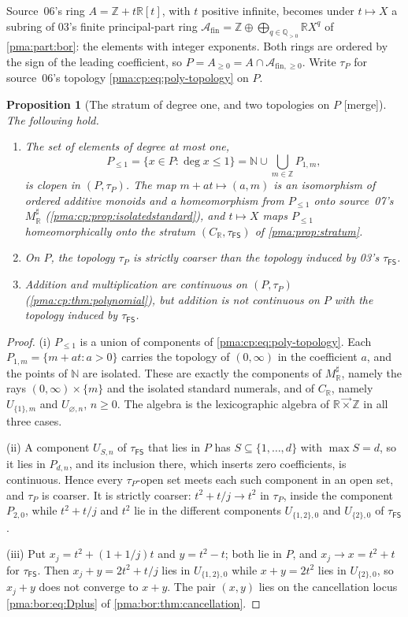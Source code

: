 \documentclass[11pt]{article}
\numberwithin{equation}{section}
\newtheorem{proposition}[proposition]{Proposition}
\theoremstyle{definition}
\theoremstyle{remark}
\newcommand{\N}{\mathbb N}
\newcommand{\Z}{\mathbb Z}
\newcommand{\Q}{\mathbb Q}
\newcommand{\R}{\mathbb R}
\newcommand{\lex}{\mathbin{\overrightarrow\times}}
\newcommand{\FS}{\mathsf{FS}}
\newcommand{\A}{\mathcal A_{\mathrm{fin}}}
\newcommand{\PP}{\mathcal A_{\mathrm{fin},\geq 0}}
\newcommand{\mergetag}{\textup{\textsf{\small[merge]}}}
\begin{document}
Source~06's ring $A=\Z+t\R[t]$, with $t$ positive infinite, becomes under
$t\mapsto X$ a subring of 03's finite principal-part ring
$\A=\Z\oplus\bigoplus_{q\in\Q_{>0}}\R X^q$ of \cref{pma:part:bor}: the
elements with integer exponents. Both rings are ordered by the sign of the
leading coefficient, so $P=A_{\ge0}=A\cap\PP$. Write $\tau_P$ for source~06's
topology \eqref{pma:cp:eq:poly-topology} on $P$.

\begin{proposition}[The stratum of degree one, and two topologies on $P$ \mergetag]\label{pma:cp:prop:meet}
The following hold.
\begin{enumerate}[label=\textup{(\roman*)}]
\item The set of elements of degree at most one,
\[\textstyle P_{\le1}=\{x\in P:\deg x\le1\}=\N\cup\bigcup_{m\in\Z}P_{1,m},\]
is clopen in $(P,\tau_P)$. The map $m+at\mapsto(a,m)$ is an isomorphism of
ordered additive monoids and a homeomorphism from $P_{\le1}$ onto source~07's
$M_{\R}^{\sharp}$ (\cref{pma:cp:prop:isolatedstandard}), and $t\mapsto X$
maps $P_{\le1}$ homeomorphically onto the stratum $(C_{\R},\tau_{\FS})$ of
\cref{pma:prop:stratum}.
\item On $P$, the topology $\tau_P$ is strictly coarser than the topology
induced by 03's $\tau_{\FS}$.
\item Addition and multiplication are continuous on $(P,\tau_P)$
(\cref{pma:cp:thm:polynomial}), but addition is not continuous on $P$ with the
topology induced by $\tau_{\FS}$.
\end{enumerate}
\end{proposition}
\begin{proof}
(i) $P_{\le1}$ is a union of components of \eqref{pma:cp:eq:poly-topology}.
Each $P_{1,m}=\{m+at:a>0\}$ carries the topology of $(0,\infty)$ in the
coefficient $a$, and the points of $\N$ are isolated. These are exactly the
components of $M_{\R}^{\sharp}$, namely the rays $(0,\infty)\times\{m\}$ and the
isolated standard numerals, and of $C_{\R}$, namely $U_{\{1\},m}$ and
$U_{\varnothing,n}$, $n\ge0$. The algebra is the lexicographic algebra of
$\R\lex\Z$ in all three cases.

(ii) A component $U_{S,n}$ of $\tau_{\FS}$ that lies in $P$ has
$S\subseteq\{1,\dots,d\}$ with $\max S=d$, so it lies in $P_{d,n}$, and its
inclusion there, which inserts zero coefficients, is continuous. Hence every
$\tau_P$-open set meets each such component in an open set, and $\tau_P$ is
coarser. It is strictly coarser: $t^2+t/j\to t^2$ in $\tau_P$, inside the
component $P_{2,0}$, while $t^2+t/j$ and $t^2$ lie in the different
components $U_{\{1,2\},0}$ and $U_{\{2\},0}$ of $\tau_{\FS}$.

(iii) Put $x_j=t^2+(1+1/j)t$ and $y=t^2-t$; both lie in $P$, and
$x_j\to x=t^2+t$ for $\tau_{\FS}$. Then $x_j+y=2t^2+t/j$ lies in
$U_{\{1,2\},0}$ while $x+y=2t^2$ lies in $U_{\{2\},0}$, so $x_j+y$ does not
converge to $x+y$. The pair $(x,y)$ lies on the cancellation locus
\eqref{pma:bor:eq:Dplus} of \cref{pma:bor:thm:cancellation}.
\end{proof}
\end{document}
